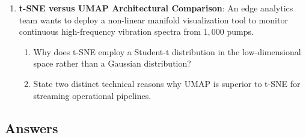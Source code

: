 \begin{checkyourself}
\begin{enumerate}
    \item \textbf{t-SNE versus UMAP Architectural Comparison}:
    An edge analytics team wants to deploy a non-linear manifold visualization tool to monitor continuous high-frequency vibration spectra from $1{,}000$ pumps.
    \begin{enumerate}[label=(\alph*)]
        \item Why does t-SNE employ a Student-t distribution in the low-dimensional space rather than a Gaussian distribution?
        \item State two distinct technical reasons why UMAP is superior to t-SNE for streaming operational pipelines.
    \end{enumerate}
\end{enumerate}
\end{checkyourself}

\subsection*{Answers}

